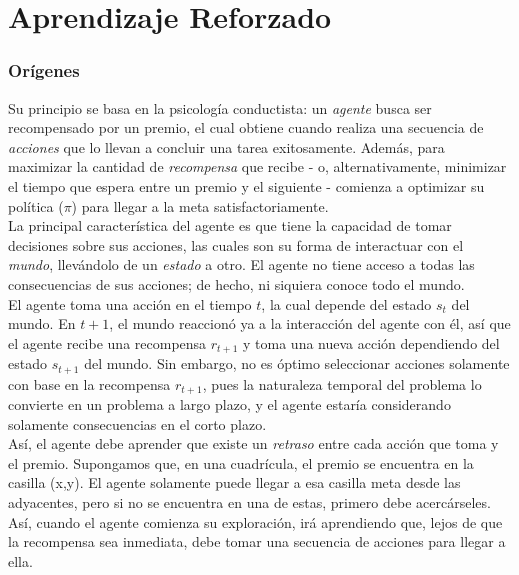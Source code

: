 

\chapter{Aprendizaje Reforzado}

\subsection{Or\'igenes}

Su principio se basa en la psicolog\'ia conductista: un \textit{agente} busca ser recompensado por un premio, el cual obtiene cuando realiza una secuencia de \textit{acciones} que lo llevan a concluir una tarea exitosamente. Adem\'as, para maximizar la cantidad de \textit{recompensa} que recibe - o, alternativamente, minimizar el tiempo que espera entre un premio y el siguiente - comienza a optimizar su pol\'itica (\textit{$\pi$}) para llegar a la meta satisfactoriamente.\\

La principal caracter\'istica del agente es que tiene la capacidad de tomar decisiones sobre sus acciones, las cuales son su forma de interactuar con el \textit{mundo}, llev\'andolo de un \textit{estado} a otro. El agente no tiene acceso a todas las consecuencias de sus acciones; de hecho, ni siquiera conoce todo el mundo.\\

El agente toma una acci\'on en el tiempo $t$, la cual depende del estado $s_t$ del mundo. En $t+1$, el mundo reaccion\'o ya a la interacci\'on del agente con \'el, as\'i que el agente recibe una recompensa $r_{t+1}$ y toma una nueva acci\'on dependiendo del estado $s_{t+1}$ del mundo. Sin embargo, no es \'optimo seleccionar acciones solamente con base en la recompensa $r_{t+1}$, pues la naturaleza temporal del problema lo convierte en un problema a largo plazo, y el agente estar\'ia considerando solamente consecuencias en el corto plazo.\\

As\'i, el agente debe aprender que existe un \textit{retraso} entre cada acci\'on que toma y el premio. Supongamos que, en una cuadr\'icula, el premio se encuentra en la casilla (x,y). El agente solamente puede llegar a esa casilla meta desde las adyacentes, pero si no se encuentra en una de estas, primero debe acerc\'arseles. As\'i, cuando el agente comienza su exploraci\'on, ir\'a aprendiendo que, lejos de que la recompensa sea inmediata, debe tomar una secuencia de acciones para llegar a ella.\\

